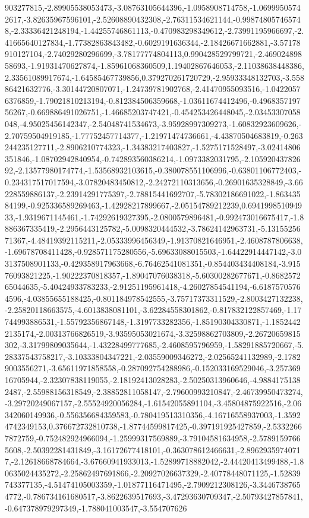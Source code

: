 \documentclass{article}
\begin{document}
903277815,-2.89905538053473,-3.08763105644396,-1.0958908714758,-1.06999505742617,-3.82635967596101,-2.52608890432308,-2.76311534621144,-0.998748057465748,-2.33336421248194,-1.44255746861113,-0.470983298349612,-2.73991195966697,-2.41665640127834,-1.77382863843482,-0.6029191636344,-2.18426671662881,-3.57178910127104,-2.74029280296699,-3.78177774804113,0.990428529799721,-2.46902489858693,-1.91931470627874,-1.85961068360509,1.19402867646053,-2.11038638448386,2.33561089917674,-1.64585467739856,0.379270261720729,-2.95933348132703,-3.55886421632776,-3.30144720807071,-1.24739781902768,-2.41470955093516,-1.04220576376859,-1.79021810213194,-0.812384506359668,-1.03611674412496,-0.496835719756267,-0.669886491026751,-1.46685203747421,-0.454253426448045,-2.03453307058048,-4.95025456142347,-2.54048741534673,-3.95928997309273,-1.60832923609626,-2.70759504919185,-1.77752457714377,-1.21971474736661,-4.43870504683819,-0.263244235127711,-2.8906210774323,-1.34383217403827,-1.5275171528497,-3.02414806351846,-1.08702942840954,-0.742893560386214,-1.0973382031795,-2.10592043782692,-2.13577980174774,-1.53568932103615,-0.380078551106996,-0.63801106772403,-0.234317517017594,-3.07820483450812,-2.24272110313656,-0.26901635328849,-3.66228559886137,-2.23914291775397,-2.78815441692707,-5.78302186691022,-1.86343584199,-0.925336589269463,-1.42928217899667,-2.05154789212239,0.694199851094933,-1.9319671145461,-1.74292619327395,-2.0800579896481,-0.992473016675417,-1.8886367335419,-2.2956443125782,-5.0098320444532,-3.78624142963731,-5.1315525671367,-4.48419392115211,-2.05333996456349,-1.91370821646951,-2.4608787806638,-1.69678708411428,-0.928571175280556,-5.69633088015503,-1.64422914447142,-3.03137508901133,-0.429358917963668,-6.76462541081351,-0.854403434408184,-3.91576093821225,-1.90222370818357,-1.89047076038318,-5.60300282677671,-0.868257265044635,-5.40424933783233,-2.91251195961418,-4.26027854541194,-6.61875705764596,-4.03855655188425,-0.801184978542555,-3.75717373311529,-2.8003427132238,-2.25820118663575,-4.6013838081101,-3.62284558301862,-0.817832122857469,-1.17744993886531,-1.55792356867148,-1.3197733282356,-1.85190304330871,-1.18524422135174,-2.00313766826519,-3.93595053021674,-3.32598862703809,-2.26720659815302,-3.31799809035644,-1.43228499777685,-2.4608595796959,-1.58291885720667,-5.28337543758217,-3.10333804347221,-2.03559009346272,-2.02565241132989,-2.17829003556271,-3.65611971858558,-0.287092754288986,-0.152033169529046,-3.25736916705944,-2.32307838119055,-2.18192413028283,-2.50250313960646,-4.98841751382487,-2.55988156318549,-2.38852811058147,-2.79600993210847,-2.46739950473274,-3.29720249067157,-2.55524920056284,-1.61542055891104,-3.45804875922516,-2.06342060149936,-0.556356684359583,-0.780419513310356,-4.16716558937003,-1.35924742349153,0.376672732810738,-1.87744599817425,-0.397191925427859,-2.53322667872759,-0.752482924966094,-1.25999317569889,-3.79104581634958,-2.57891597665608,-2.50392281431849,-3.16172677418101,-0.363078612466631,-2.89629359740717,-2.12618668784664,-3.67660941933013,-1.52899718882042,-2.44420413499488,-1.80635024435272,-2.25862497691866,-2.20927026637329,-2.40778448071125,-1.52839743377135,-4.51474105003359,-1.01877116471495,-2.7909212308126,-3.34467387654772,-0.786734161680517,-3.8622639517693,-3.47293630709347,-2.50793427857841,-0.647378979297349,-1.788041003547,-3.554707626
\end{document}
